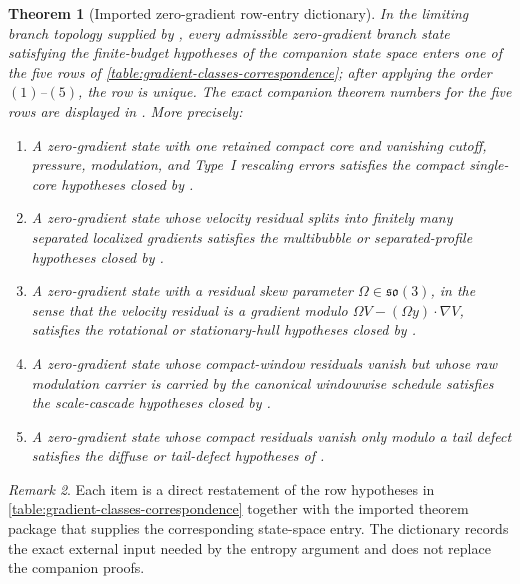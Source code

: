 \documentclass[11pt]{amsart}
\numberwithin{equation}{section}
\theoremstyle{plain}
\newtheorem{theorem}{Theorem}[section]
\theoremstyle{definition}
\theoremstyle{remark}
\newtheorem{remark}[theorem]{Remark}
\begin{document}
\begin{theorem}[Imported zero-gradient row-entry dictionary]
\label{prop:conditional-row-entry-dictionary}
In the limiting branch topology supplied by
, every
admissible zero-gradient branch state satisfying the finite-budget hypotheses
of the companion state space enters one of the five rows of
\cref{table:gradient-classes-correspondence}; after applying the order
\((1)\)--\((5)\), the row is unique.  The exact companion theorem numbers for
the five rows are displayed in .  More
precisely:
\begin{enumerate}[label=\textup{(\roman*)},leftmargin=2.2em]
	\item A zero-gradient state with one retained compact core and vanishing
	cutoff, pressure, modulation, and Type~I rescaling errors satisfies the
	compact single-core hypotheses closed by
	.

	\item A zero-gradient state whose velocity residual splits into finitely
	many separated localized gradients satisfies the multibubble or
	separated-profile hypotheses closed by
	.

	\item A zero-gradient state with a residual skew parameter
	\(\Omega\in\mathfrak{so}(3)\), in the sense that the velocity residual is
	a gradient modulo \(\Omega V-(\Omega y)\cdot\nabla V\), satisfies the
	rotational or stationary-hull hypotheses closed by
	.

	\item A zero-gradient state whose compact-window residuals vanish but
	whose raw modulation carrier is carried by the canonical windowwise schedule
	satisfies the scale-cascade hypotheses closed by
	.

	\item A zero-gradient state whose compact residuals vanish only modulo a
	tail defect satisfies the diffuse or tail-defect hypotheses of
	.
\end{enumerate}
\end{theorem}

\begin{remark}
Each item is a direct restatement of the row hypotheses in
\cref{table:gradient-classes-correspondence} together with the imported
theorem package that supplies the corresponding state-space entry.  The
dictionary records the exact external input needed by the entropy argument
and does not replace the companion proofs.
\end{remark}
\end{document}
